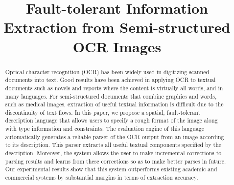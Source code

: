 \documentclass[Afour,sageh,times]{sagej}
\begin{document}
\runninghead{}

\title{Fault-tolerant Information Extraction from Semi-structured OCR Images}

\begin{abstract}
Optical character recognition (OCR) has been widely used in digitizing scanned
documents into text. Good results have been achieved in applying OCR to textual
documents such as novels and reports where the 
content is virtually all words, and in many languages. 
For semi-structured documents that combine graphics and words,
such as medical images, extraction of useful textual information is difficult
due to the discontinuity of text flows. In this paper, we 
propose a spatial, fault-tolerant description language that allows users to 
specify a rough format of the image along with type information and
constraints. 
The evaluation engine of this language automatically generates a
reliable parser of the OCR output from an image according to 
its description. This parser extracts all useful textual components specified
by the description. Moreover, the system allows
the user to make incremental corrections to parsing results 
and learns from these corrections so as to make better parses in future. 
Our experimental results show
that this system outperforms existing academic and commercial systems by
substantial margins in terms of extraction accuracy.
\end{abstract}


\maketitle













%
%
%



\end{document}
